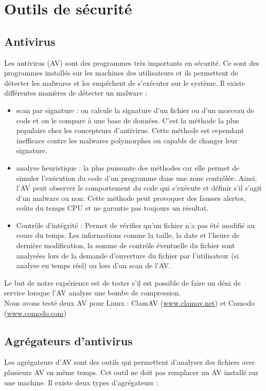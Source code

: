\documentclass[smallextended]{svjour3}       %
\begin{document}
\section{Outils de sécurité}
\label{2.Outils}

\subsection{Antivirus}
\label{2.1antivirus}
Les antivirus (AV) sont des programmes très importants en sécurité. Ce sont des programmes installés sur les machines des utilisateurs et ils permettent de détecter les malwares et les empêchent de s’exécuter sur le système. Il existe différentes manières de détecter un malware : 
\begin{itemize}
\item scan par signature : on calcule la signature d'un fichier ou d'un morceau de code et on le compare à une base de données. C'est la méthode la plus populaire chez les concepteurs d'antivirus. Cette méthode est cependant inefficace contre les malwares polymorphes ou capable de changer leur signature.
\item analyse heuristique : la plus puissante des méthodes car elle permet de simuler l’exécution du code d'un programme dans une zone contrôlée. Ainsi, l'AV peut observer le comportement du code qui s’exécute et définir s'il s'agit d'un malware ou non. Cette méthode peut provoquer des fausses alertes, coûte du temps CPU et ne garantie pas toujours un résultat.
\item Contrôle d'intégrité : Permet de vérifier qu'un fichier n'a pas été modifié au cours du temps. Les informations comme la taille, la date et l'heure de dernière modification, la somme de contrôle éventuelle du fichier sont analysées lors de la demande d'ouverture du fichier par l'utilisateur (si analyse en temps réel) ou lors d'un scan de l'AV.\\
\end{itemize}
Le but de notre expérience est de tester s'il est possible de faire un déni de service lorsque l'AV analyse une bombe de compression.\\
Nous avons testé deux AV pour Linux : ClamAV (\url{www.clamav.net}) et Comodo (\url{www.comodo.com})\\

\subsection{Agrégateurs d'antivirus}
\label{2.2agrégateurs}
Les agrégateurs d'AV sont des outils qui permettent d'analyser des fichiers avec plusieurs AV en même temps. Cet outil ne doit pas remplacer un AV installé sur une machine. Il existe deux types d’agrégateurs :  
\end{document}
